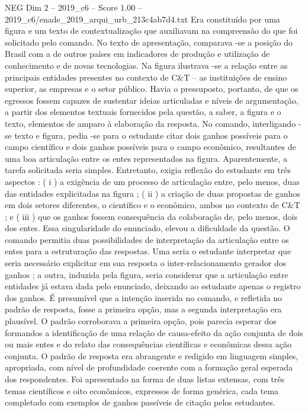 \begin{textsample}{NEG Dim 2 – 2019\_c6 – Score 1.00 – 2019\_c6/enade\_2019\_arqui\_urb\_213c4ab7d4.txt}
Era constituído por uma figura e um texto de contextualização que auxiliavam na compreensão do que foi solicitado pelo comando.
No texto de apresentação, comparava -se a posição do Brasil com a de outros países em indicadores de produção e utilização de conhecimento e de novas tecnologias.
Na figura ilustrava -se a relação entre as principais entidades presentes no contexto de C\&T – as instituições de ensino superior, as empresas e o setor público.
Havia o pressuposto, portanto, de que os egressos fossem capazes de sustentar ideias articuladas e níveis de argumentação, a partir dos elementos textuais fornecidos pela questão, a saber, a figura e o texto, elementos de amparo à elaboração da resposta.
No comando, interligando -se texto e figura, pedia -se para o estudante citar dois ganhos possíveis para o campo científico e dois ganhos possíveis para o campo econômico, resultantes de uma boa articulação entre os entes representados na figura.
Aparentemente, a tarefa solicitada seria simples.
Entretanto, exigia reflexão do estudante em três aspectos : ( i ) a exigência de um processo de articulação entre, pelo menos, duas das entidades explicitadas na figura ; ( ii ) a criação de duas propostas de ganhos em dois setores diferentes, o científico e o econômico, ambos no contexto de C\&T ; e ( iii ) que os ganhos fossem consequência da colaboração de, pelo menos, dois dos entes.
Essa singularidade do enunciado, elevou a dificuldade da questão.
O comando permitia duas possibilidades de interpretação da articulação entre os entes para a estruturação das respostas.
Uma seria o estudante interpretar que seria necessário explicitar em sua resposta o inter-relacionamento gerador dos ganhos ; a outra, induzida pela figura, seria considerar que a articulação entre entidades já estava dada pelo enunciado, deixando ao estudante apenas o registro dos ganhos.
É presumível que a intenção inserida no comando, e refletida no padrão de resposta, fosse a primeira opção, mas a segunda interpretação era plausível.
O padrão corroborava a primeira opção, pois parecia esperar dos formandos a identificação de uma relação de causa-efeito da ação conjunta de dois ou mais entes e do relato das consequências científicas e econômicas dessa ação conjunta.
O padrão de resposta era abrangente e redigido em linguagem simples, apropriada, com nível de profundidade coerente com a formação geral esperada dos respondentes.
Foi apresentado na forma de duas listas extensas, com três temas científicos e oito econômicos, expressos de forma genérica, cada tema completado com exemplos de ganhos passíveis de citação pelos estudantes.

\end{textsample}
